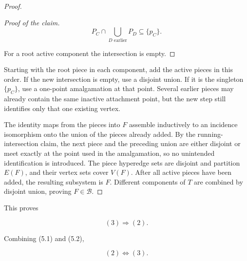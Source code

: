 \documentclass[a4paper,11pt,reqno]{amsart}
\theoremstyle{plain}
\theoremstyle{definition}
\theoremstyle{remark}
\begin{document}
\begin{proof}
\begin{proof}[Proof of the claim]
\[
P_C\cap\bigcup_{D\text{ earlier}}P_D\subseteq\{p_C\}.
\]

For a root active component the intersection is empty.
\end{proof}

Starting with the root piece in each component, add the active pieces in this
order. If the new intersection is empty, use a disjoint union. If it is the
singleton \(\{p_C\}\), use a one-point amalgamation at that point. Several
earlier pieces may already contain the same inactive attachment point, but
the new step still identifies only that one existing vertex.

The identity maps from the pieces into \(F\) assemble inductively to an
incidence isomorphism onto the union of the pieces already added.  By the
running-intersection claim, the next piece and the preceding union are either
disjoint or meet exactly at the point used in the amalgamation, so no
unintended identification is introduced.  The piece hyperedge sets are
disjoint and partition \(E(F)\), and their vertex sets cover \(V(F)\).
After all active pieces have been added, the resulting subsystem is \(F\).
Different components of \(T\) are combined by disjoint union, proving
\(F\in\mathcal B\).
\end{proof}

This proves

\[
(3)\Longrightarrow(2). \tag{5.2}
\]

Combining (5.1) and (5.2),

\[
(2)\Longleftrightarrow(3). \tag{5.3}
\]
\end{document}

